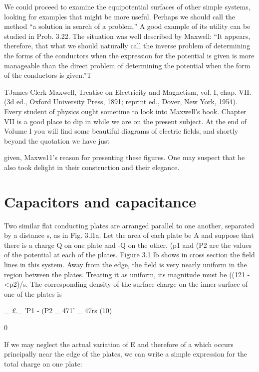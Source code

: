We could proceed to examine the equipotential surfaces of other
simple systems, looking for examples that might be more useful.
Perhaps we should call the method ``a solution in search of a
problem.'' A good example of its utility can be studied in Prob. 3.22.
The situation was well described by Maxwell: ``It appears, therefore,
that what we should naturally call the inverse problem of determining
the forms of the conductors when the expression for the potential
is given is more manageable than the direct problem of determining
the potential when the form of the conductors is given.''T

TJames Clerk Maxwell, Treatise on Electricity and Magnetism, vol. I, chap. VII.
(3d ed., Oxford University Press, 1891; reprint ed., Dover, New York, 1954). Every
student of physics ought sometime to look into Maxwell's book. Chapter VII is a good
place to dip in while we are on the present subject. At the end of Volume I you will find
some beautiful diagrams of electric fields, and shortly beyond the quotation we have just

given, Maxwe11's reason for presenting these figures. One may suspect that he also took
delight in their construction and their elegance.

\section{Capacitors and capacitance}

Two similar flat conducting plates are arranged parallel to one
another, separated by a distance s, as in Fig. 3.l1a. Let the area of
each plate be A and suppose that there is a charge Q on one plate
and -Q on the other. (p1 and (P2 are the values of the potential at
each of the plates. Figure 3.1 lb shows in cross section the field lines
in this system. Away from the edge, the field is very nearly uniform
in the region between the plates. Treating it as uniform, its magnitude
must be ((121 - <p2)/s. The corresponding density of the surface
charge on the inner surface of one of the plates is

_ £_ 'P1 - (P2
_ 471' _ 47rs (10)

0

 

If we may neglect the actual variation of E and therefore of a which
occurs principally near the edge of the plates, we can write a simple
expression for the total charge on one plate:



